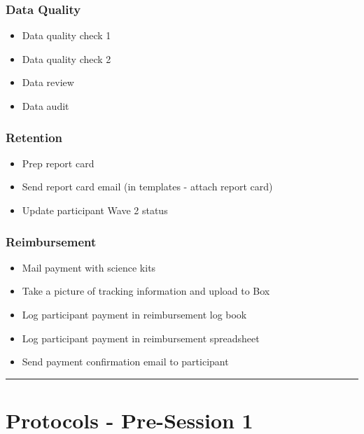 \documentclass[]{book}
\providecommand{\tightlist}{%
  \setlength{\itemsep}{0pt}\setlength{\parskip}{0pt}}
\begin{document}
\hypertarget{data-quality}{%
\subsubsection{Data Quality}\label{data-quality}}

\begin{itemize}
\tightlist
\item
  Data quality check 1
\item
  Data quality check 2
\item
  Data review
\item
  Data audit
\end{itemize}

\hypertarget{retention}{%
\subsubsection{Retention}\label{retention}}

\begin{itemize}
\tightlist
\item
  Prep report card
\item
  Send report card email (in templates - attach report card)
\item
  Update participant Wave 2 status
\end{itemize}

\hypertarget{reimbursement}{%
\subsubsection{Reimbursement}\label{reimbursement}}

\begin{itemize}
\tightlist
\item
  Mail payment with science kits
\item
  Take a picture of tracking information and upload to Box
\item
  Log participant payment in reimbursement log book
\item
  Log participant payment in reimbursement spreadsheet
\item
  Send payment confirmation email to participant
\end{itemize}

\begin{center}\rule{0.5\linewidth}{0.5pt}\end{center}

\hypertarget{protocols---pre-session-1}{%
\section{Protocols - Pre-Session 1}\label{protocols---pre-session-1}}
\end{document}
